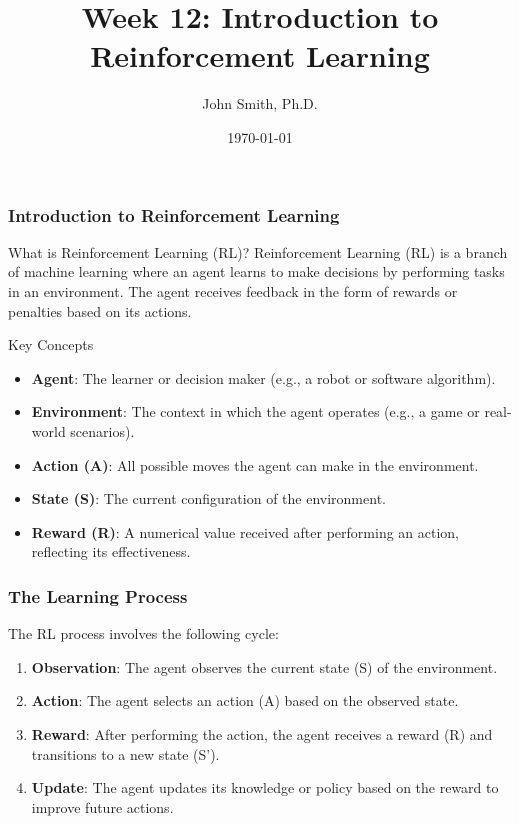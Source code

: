 \documentclass[aspectratio=169]{beamer}
\title[Introduction to RL]{Week 12: Introduction to Reinforcement Learning}
\author[J. Smith]{John Smith, Ph.D.}
\institute[University Name]{
  Department of Computer Science\\
  University Name\\
  \vspace{0.3cm}
  Email: email@university.edu\\
  Website: www.university.edu
}
\date{\today}
\begin{document}
\frame{\titlepage}

\begin{frame}[fragile]
    \frametitle{Introduction to Reinforcement Learning}
    \begin{block}{What is Reinforcement Learning (RL)?}
        Reinforcement Learning (RL) is a branch of machine learning where an agent learns to make decisions by performing tasks in an environment. The agent receives feedback in the form of rewards or penalties based on its actions.
    \end{block}
    
    \begin{block}{Key Concepts}
        \begin{itemize}
            \item \textbf{Agent}: The learner or decision maker (e.g., a robot or software algorithm).
            \item \textbf{Environment}: The context in which the agent operates (e.g., a game or real-world scenarios).
            \item \textbf{Action (A)}: All possible moves the agent can make in the environment.
            \item \textbf{State (S)}: The current configuration of the environment.
            \item \textbf{Reward (R)}: A numerical value received after performing an action, reflecting its effectiveness.
        \end{itemize}
    \end{block}
\end{frame}

\begin{frame}[fragile]
    \frametitle{The Learning Process}
    The RL process involves the following cycle:
    \begin{enumerate}
        \item \textbf{Observation}: The agent observes the current state (S) of the environment.
        \item \textbf{Action}: The agent selects an action (A) based on the observed state.
        \item \textbf{Reward}: After performing the action, the agent receives a reward (R) and transitions to a new state (S').
        \item \textbf{Update}: The agent updates its knowledge or policy based on the reward to improve future actions.
    \end{enumerate}
\end{frame}
\end{document}
